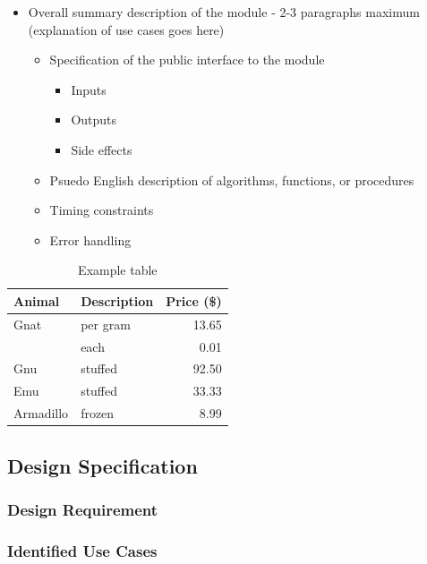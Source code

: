 \documentclass[12pt]{article} %
\begin{document}
\begin{itemize}
	\item Overall summary description of the module - 2-3 paragraphs maximum
		(explanation of use cases goes here)

		\begin{itemize}
			\item Specification of the public interface to the module

				\begin{itemize}
					\item Inputs
					\item Outputs
					\item Side effects
				\end{itemize}

			\item Psuedo English description of algorithms, functions, or procedures
			\item Timing constraints
			\item Error handling
		\end{itemize}
\end{itemize}

\begin{table}[h]
	\centering
	\begin{tabular}{llr}
		\toprule
		Animal    & Description & Price (\$) \\
		\midrule
		Gnat      & per gram    & 13.65      \\
		& each        & 0.01       \\
		Gnu       & stuffed     & 92.50      \\
		Emu       & stuffed     & 33.33      \\
		Armadillo & frozen      & 8.99       \\
		\bottomrule
	\end{tabular}
	\caption{Example table}
	\label{table:ex}
\end{table}

\subsection{Design Specification\label{sec:designSpec}} 

\subsubsection{Design Requirement\label{sec:requirements}} %

\subsubsection{Identified Use Cases\label{sec:identifiedUseCases}} %
\end{document}
